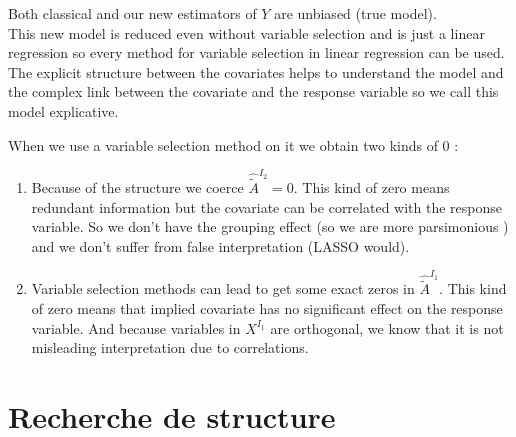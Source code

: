 \documentclass[12pt]{article}
\begin{document}
		Both classical and our new estimators of $Y$ are unbiased (true model)\cite{saporta2006probabilites}.
	\\	
			This new model is reduced even without variable selection and is just a linear regression so every method for variable selection in linear regression can be used. 
		 \\				
			The explicit structure between the covariates helps to understand the model and the complex link between the covariate and the response variable so we call this model explicative.	
			
			When we use a variable selection method on it we obtain two kinds of 0 :
			\begin{enumerate}
			\item Because of the structure we coerce $\hat{\tilde{A}}^{I_2} = 0 $. This kind of zero means redundant information but the covariate can be correlated with the response variable. So we don't have the grouping effect (so we are more parsimonious ) and we don't suffer from false interpretation (LASSO would).
			\item Variable selection methods can lead to get some exact zeros in $\hat{\tilde{A}}^{I_1}$. This kind of zero means that implied covariate has no significant effect on the response variable. And because variables in $X^{I_1}$ are orthogonal, we know that it is not misleading interpretation due to correlations.
			\end{enumerate}
\section{Recherche de structure}
	 	
\end{document}

